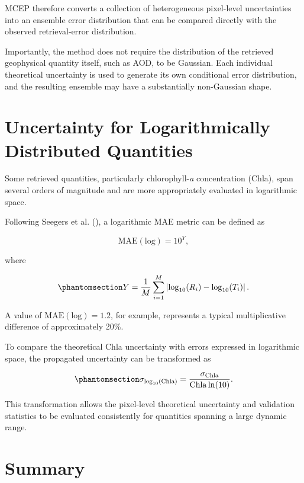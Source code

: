 \documentclass[
  11pt,
  letterpaper,
]{scrreprt}
\begin{document}
MCEP therefore converts a collection of heterogeneous pixel-level
uncertainties into an ensemble error distribution that can be compared
directly with the observed retrieval-error distribution.

Importantly, the method does not require the distribution of the
retrieved geophysical quantity itself, such as AOD, to be Gaussian. Each
individual theoretical uncertainty is used to generate its own
conditional error distribution, and the resulting ensemble may have a
substantially non-Gaussian shape.

\section{Uncertainty for Logarithmically Distributed
Quantities}\label{uncertainty-for-logarithmically-distributed-quantities}

Some retrieved quantities, particularly chlorophyll-\emph{a}
concentration (Chla), span several orders of magnitude and are more
appropriately evaluated in logarithmic space.

Following Seegers et al. (), a
logarithmic MAE metric can be defined as

\[
\mathrm{MAE(log)}
=
10^Y,
\]

where

\begin{equation}\phantomsection\label{eq-uq-maelog}{
Y
=
\frac{1}{M}
\sum_{i=1}^{M}
\left|
\log_{10}(R_i)
-
\log_{10}(T_i)
\right|.
}\end{equation}

A value of \(\mathrm{MAE(log)}=1.2\), for example, represents a typical
multiplicative difference of approximately 20\%.

To compare the theoretical Chla uncertainty with errors expressed in
logarithmic space, the propagated uncertainty can be transformed as

\begin{equation}\phantomsection\label{eq-uq-chla-log}{
\sigma_{\log_{10}(\mathrm{Chla})}
=
\frac{
\sigma_{\mathrm{Chla}}
}{
\mathrm{Chla}\ln(10)
}.
}\end{equation}

This transformation allows the pixel-level theoretical uncertainty and
validation statistics to be evaluated consistently for quantities
spanning a large dynamic range.

\section{Summary}\label{summary-1}
\end{document}
